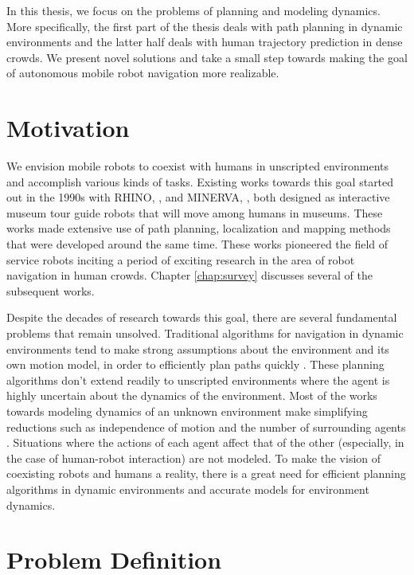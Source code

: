 In this thesis, we focus on the problems of planning and modeling dynamics. More specifically, the first part of the thesis deals with  path planning in dynamic environments and the latter half deals with human trajectory prediction in dense crowds. We present novel solutions and take a small step towards making the goal of autonomous mobile robot navigation more realizable.

\section{Motivation}
\label{sec:intro-motiv-chall}

We envision mobile robots to coexist with humans in unscripted environments and accomplish various kinds of tasks. Existing works towards this goal started out in the 1990s with RHINO, \cite{thrun99}, and MINERVA, \cite{Thrun2000ProbabilisticAA}, both designed as interactive museum tour guide robots that will move among humans in museums. These works made extensive use of path planning, localization and mapping methods that were developed around the same time. These works pioneered the field of service robots inciting a period of exciting research in the area of robot navigation in human crowds. Chapter \ref{chap:survey} discusses several of the subsequent works.

Despite the decades of research towards this goal, there are several fundamental problems that remain unsolved. Traditional algorithms for navigation in dynamic environments tend to make strong assumptions about the environment and its own motion model, in order to efficiently plan paths quickly \cite{lavalle2006planning, latombe2012robot}. These planning algorithms don't extend readily to unscripted environments where the agent is highly uncertain about the dynamics of the environment. Most of the works towards modeling dynamics of an unknown environment make simplifying reductions such as independence of motion and the number of surrounding agents \cite{choset2005principles}. Situations where the actions of each agent affect that of the other (especially, in the case of human-robot interaction) are not modeled. To make the vision of coexisting robots and humans a reality, there is a great need for efficient planning algorithms in dynamic environments and accurate models for environment dynamics.

\section{Problem Definition}
\label{sec:intro-background}

